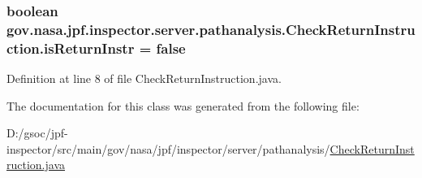 \subsubsection[{\texorpdfstring{is\+Return\+Instr}{isReturnInstr}}]{\setlength{\rightskip}{0pt plus 5cm}boolean gov.\+nasa.\+jpf.\+inspector.\+server.\+pathanalysis.\+Check\+Return\+Instruction.\+is\+Return\+Instr = false\hspace{0.3cm}{\ttfamily [private]}}\hypertarget{classgov_1_1nasa_1_1jpf_1_1inspector_1_1server_1_1pathanalysis_1_1_check_return_instruction_a7c2c213e13f8ab7c6efdb264730be720}{}\label{classgov_1_1nasa_1_1jpf_1_1inspector_1_1server_1_1pathanalysis_1_1_check_return_instruction_a7c2c213e13f8ab7c6efdb264730be720}


Definition at line 8 of file Check\+Return\+Instruction.\+java.



The documentation for this class was generated from the following file\+:\begin{DoxyCompactItemize}
\item 
D\+:/gsoc/jpf-\/inspector/src/main/gov/nasa/jpf/inspector/server/pathanalysis/\hyperlink{_check_return_instruction_8java}{Check\+Return\+Instruction.\+java}\end{DoxyCompactItemize}
